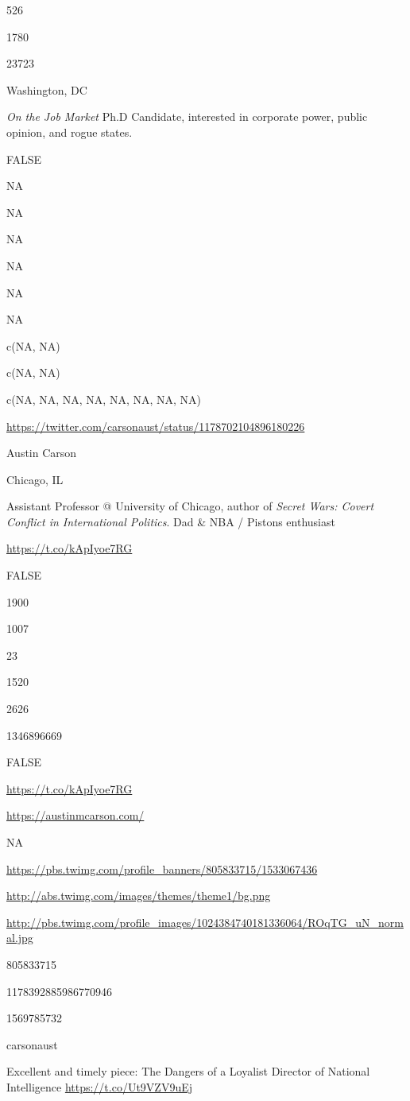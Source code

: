 \documentclass[]{book}
\begin{document}
526

1780

23723

Washington, DC

\emph{On the Job Market} Ph.D Candidate, interested in corporate power,
public opinion, and rogue states. \citet{GWtweets} \citet{starwars}

FALSE

NA

NA

NA

NA

NA

NA

c(NA, NA)

c(NA, NA)

c(NA, NA, NA, NA, NA, NA, NA, NA)

\url{https://twitter.com/carsonaust/status/1178702104896180226}

Austin Carson

Chicago, IL

Assistant Professor @ University of Chicago, author of \emph{Secret
Wars: Covert Conflict in International Politics}. Dad \& NBA / Pistons
enthusiast

\url{https://t.co/kApIyoe7RG}

FALSE

1900

1007

23

1520

2626

1346896669

FALSE

\url{https://t.co/kApIyoe7RG}

\url{https://austinmcarson.com/}

NA

\url{https://pbs.twimg.com/profile_banners/805833715/1533067436}

\url{http://abs.twimg.com/images/themes/theme1/bg.png}

\url{http://pbs.twimg.com/profile_images/1024384740181336064/ROqTG_uN_normal.jpg}

805833715

1178392885986770946

1569785732

carsonaust

Excellent and timely \citet{carsonaust} piece: The Dangers of a Loyalist
Director of National Intelligence \url{https://t.co/Ut9VZV9uEj}
\end{document}
